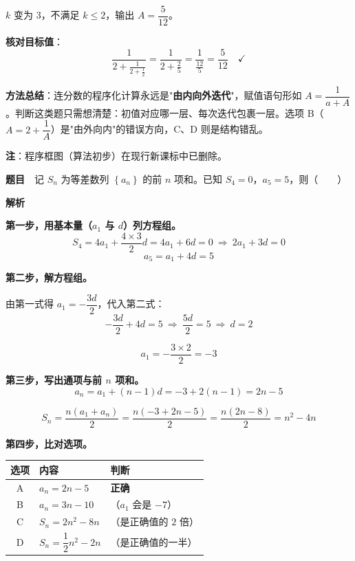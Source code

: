 $k$ 变为 $3$，不满足 $k\le2$，输出 $A=\dfrac5{12}$。

\textbf{核对目标值}：
\[\frac1{2+\frac1{2+\frac12}}=\frac1{2+\frac25}=\frac1{\frac{12}5}=\frac5{12}\quad\checkmark\]


\begin{gktip}
\textbf{方法总结}：连分数的程序化计算永远是"\textbf{由内向外迭代}"，赋值语句形如 $A=\dfrac1{a+A}$。判断这类题只需想清楚：初值对应哪一层、每次迭代包裹一层。选项 B（$A=2+\dfrac1A$）是"由外向内"的错误方向，C、D 则是结构错乱。

\textbf{注}：程序框图（算法初步）在现行新课标中已删除。
\end{gktip}

\par\medskip


\textbf{题目}　记 $S_n$ 为等差数列 $\left\{a_n\right\}$ 的前 $n$ 项和。已知 $S_4=0$，$a_5=5$，则（　　）

\textbf{解析}

\textbf{第一步，用基本量（$a_1$ 与 $d$）列方程组。}
\[S_4=4a_1+\frac{4\times3}2d=4a_1+6d=0\ \Longrightarrow\ 2a_1+3d=0\]
\[a_5=a_1+4d=5\]

\textbf{第二步，解方程组。}

由第一式得 $a_1=-\dfrac{3d}2$，代入第二式：
\[-\frac{3d}2+4d=5\ \Longrightarrow\ \frac{5d}2=5\ \Longrightarrow\ d=2\]

\[a_1=-\frac{3\times2}2=-3\]

\textbf{第三步，写出通项与前 $n$ 项和。}
\[a_n=a_1+(n-1)d=-3+2(n-1)=2n-5\]

\[S_n=\frac{n\left(a_1+a_n\right)}2=\frac{n(-3+2n-5)}2=\frac{n(2n-8)}2=n^{2}-4n\]

\textbf{第四步，比对选项。}

\begin{center}
\begin{tabular}{cll}
\toprule
选项 & 内容 & 判断 \\
\midrule
A & $a_n=2n-5$ &  \textbf{正确} \\
B & $a_n=3n-10$ & （$a_1$ 会是 $-7$） \\
C & $S_n=2n^{2}-8n$ & （是正确值的 $2$ 倍） \\
D & $S_n=\dfrac12n^{2}-2n$ & （是正确值的一半） \\
\bottomrule
\end{tabular}
\end{center}

